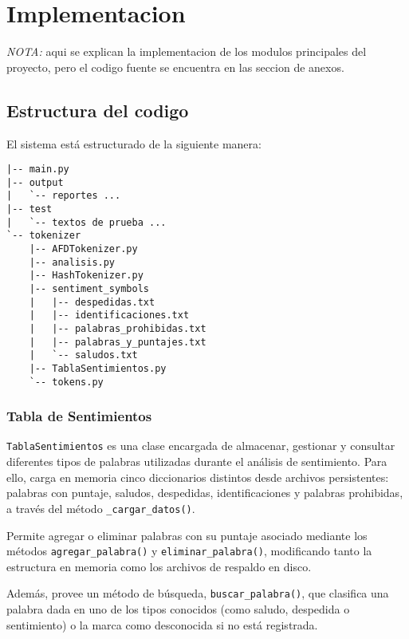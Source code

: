 \section{Implementacion}
\textit{NOTA:} aqui se explican la implementacion de los modulos principales del proyecto, pero
el codigo fuente se encuentra en las seccion de anexos.

\subsection{Estructura del codigo}
El sistema está estructurado de la siguiente manera:

\begin{tcolorbox}[colback=gray!10, colframe=gray!80, sharp corners, boxrule=0.5pt]
	\begin{verbatim}
|-- main.py
|-- output
|   `-- reportes ...
|-- test
|   `-- textos de prueba ...
`-- tokenizer
    |-- AFDTokenizer.py
    |-- analisis.py
    |-- HashTokenizer.py
    |-- sentiment_symbols
    |   |-- despedidas.txt
    |   |-- identificaciones.txt
    |   |-- palabras_prohibidas.txt
    |   |-- palabras_y_puntajes.txt
    |   `-- saludos.txt
    |-- TablaSentimientos.py
    `-- tokens.py
\end{verbatim}
\end{tcolorbox}

\subsubsection{Tabla de Sentimientos}
\texttt{TablaSentimientos} es una clase encargada de almacenar, gestionar y consultar
diferentes tipos de palabras utilizadas durante el análisis de sentimiento. Para ello, carga en
memoria cinco diccionarios distintos desde archivos persistentes: palabras con puntaje,
saludos, despedidas, identificaciones y palabras prohibidas, a través del método \texttt{\_cargar\_datos()}.

Permite agregar o eliminar palabras con su puntaje asociado mediante los métodos
\texttt{agregar\_palabra()} y \texttt{eliminar\_palabra()}, modificando tanto la estructura en
memoria como los archivos de respaldo en disco.

Además, provee un método de búsqueda, \texttt{buscar\_palabra()}, que clasifica una palabra
dada en uno de los tipos conocidos (como saludo, despedida o sentimiento) o la marca como
desconocida si no está registrada.

